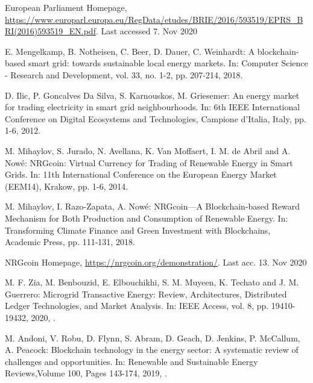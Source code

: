 \documentclass[runningheads]{llncs}
\begin{document}
%
%
%
% 
% 
%
\begin{thebibliography}{8}
European Parliament Homepage, \url{https://www.europarl.europa.eu/RegData/etudes/BRIE/2016/593519/EPRS\_BRI(2016)593519\_EN.pdf}. Last accessed 7. Nov 2020

E. Mengelkamp, B. Notheisen, C. Beer, D. Dauer, C. Weinhardt: A blockchain-based smart grid: towards sustainable local energy markets. In:  Computer Science - Research and Development, vol. 33, no. 1-2, pp. 207-214, 2018. 

D. Ilic, P. Goncalves Da Silva, S. Karnouskos, M. Griesemer: An energy market for trading electricity in smart grid neighbourhoods. In: 6th IEEE International Conference on Digital Ecosystems and Technologies, Campione d'Italia, Italy, pp. 1-6, 2012. 

M. Mihaylov, S. Jurado, N. Avellana, K. Van Moffaert, I. M. de Abril and A. Nowé: NRGcoin: Virtual Currency for Trading of Renewable Energy in Smart Grids. In: 11th International Conference on the European Energy Market (EEM14), Krakow, pp. 1-6, 2014. 

M. Mihaylov, I. Razo-Zapata, A. Nowé: NRGcoin—A Blockchain-based Reward Mechanism for Both Production and Consumption of Renewable Energy. In: Transforming Climate Finance and Green Investment with Blockchains, Academic Press, pp. 111-131, 2018.

NRGcoin Homepage, \url{https://nrgcoin.org/demonstration/}. Last acc. 13. Nov 2020

M. F. Zia, M. Benbouzid, E. Elbouchikhi, S. M. Muyeen, K. Techato and J. M. Guerrero:  Microgrid Transactive Energy: Review, Architectures, Distributed Ledger Technologies, and Market Analysis. In: IEEE Access, vol. 8, pp. 19410-19432, 2020, .

M. Andoni, V. Robu, D. Flynn, S. Abram, D. Geach, D. Jenkins, P. McCallum, A. Peacock:
Blockchain technology in the energy sector: A systematic review of challenges and opportunities. In: Renewable and Sustainable Energy Reviews,Volume 100, Pages 143-174, 2019, .


\end{thebibliography}
\end{document}
